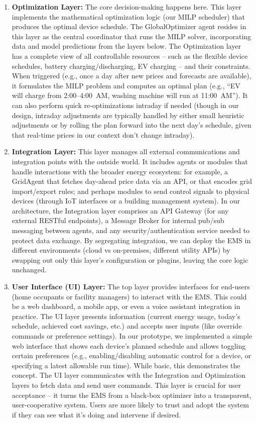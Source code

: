 \documentclass[12pt,a4paper]{article}
\begin{document}
\begin{enumerate}
    \item \textbf{Optimization Layer:} The core decision-making happens here. This layer implements the mathematical optimization logic (our MILP scheduler) that produces the optimal device schedule. The GlobalOptimizer agent resides in this layer as the central coordinator that runs the MILP solver, incorporating data and model predictions from the layers below. The Optimization layer has a complete view of all controllable resources – such as the flexible device schedules, battery charging/discharging, EV charging – and their constraints. When triggered (e.g., once a day after new prices and forecasts are available), it formulates the MILP problem and computes an optimal plan (e.g., “EV will charge from 2:00–4:00~AM, washing machine will run at 11:00~AM”). It can also perform quick re-optimizations intraday if needed (though in our design, intraday adjustments are typically handled by either small heuristic adjustments or by rolling the plan forward into the next day’s schedule, given that real-time prices in our context don’t change intraday).
    \item \textbf{Integration Layer:} This layer manages all external communications and integration points with the outside world. It includes agents or modules that handle interactions with the broader energy ecosystem: for example, a GridAgent that fetches day-ahead price data via an API, or that encodes grid import/export rules; and perhaps modules to send control signals to physical devices (through IoT interfaces or a building management system). In our architecture, the Integration layer comprises an API Gateway (for any external RESTful endpoints), a Message Broker for internal pub/sub messaging between agents, and any security/authentication service needed to protect data exchange. By segregating integration, we can deploy the EMS in different environments (cloud vs on-premises, different utility APIs) by swapping out only this layer’s configuration or plugins, leaving the core logic unchanged.
    \item \textbf{User Interface (UI) Layer:} The top layer provides interfaces for end-users (home occupants or facility managers) to interact with the EMS. This could be a web dashboard, a mobile app, or even a voice assistant integration in practice. The UI layer presents information (current energy usage, today’s schedule, achieved cost savings, etc.) and accepts user inputs (like override commands or preference settings). In our prototype, we implemented a simple web interface that shows each device’s planned schedule and allows toggling certain preferences (e.g., enabling/disabling automatic control for a device, or specifying a latest allowable run time). While basic, this demonstrates the concept. The UI layer communicates with the Integration and Optimization layers to fetch data and send user commands. This layer is crucial for user acceptance – it turns the EMS from a black-box optimizer into a transparent, user-cooperative system. Users are more likely to trust and adopt the system if they can see what it’s doing and intervene if desired.
\end{enumerate}
\end{document}
